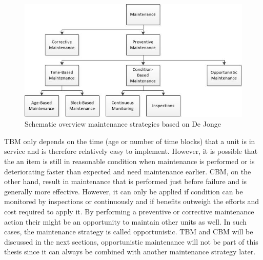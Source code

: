 \begin{figure}[ht]
\centering
\includegraphics[width=\textwidth]{Figures/Maintenance}
\caption[Schematic overview maintenance strategies]{Schematic overview maintenance strategies based on De Jonge\parencite{DeJonge2017}}
\label{fig:Maintenance overview}
\end{figure}

TBM only depends on the time (age or number of time blocks) that a unit is in service and is therefore relatively easy to implement. However, it is possible that the an item is still in reasonable condition when maintenance is performed or is deteriorating faster than expected and need maintenance earlier. CBM, on the other hand, result in maintenance that is performed just before failure and is generally more effective. However, it can only be applied if condition can be monitored by inspections or continuously and if benefits outweigh the efforts and cost required to apply it. By performing a preventive or corrective maintenance action their might be an opportunity to maintain other units as well. In such cases, the maintenance strategy is called opportunistic. TBM and CBM will be discussed in the next sections, opportunistic maintenance will not be part of this thesis since it can always be combined with another maintenance strategy later. 

